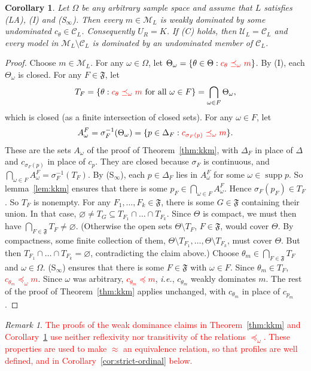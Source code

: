 \documentclass[11pt]{article}
\newtheorem{corollary}[theorem]{Corollary}
\theoremstyle{definition}
\theoremstyle{remark}
\newtheorem{remark}[theorem]{Remark}
\newcommand{\M}{\mathcal M}
\newcommand{\C}{\mathcal C}
\newcommand{\F}{\mathfrak F}
\newcommand{\U}{\mathcal U}
\newcommand{\supp}{\operatorname{supp}}
\begin{document}
\begin{corollary}\label{cor:infinite}
Let $\Omega$ be any arbitrary sample space and assume that $L$ satisfies (LA), (I) and (S$_\infty$). Then every $m\in\M_L$ is weakly dominated by some undominated $c_\theta\in\C_L$. Consequently $U_R=K$. If (C) holds, then $\U_L=\C_L$ and every model in $\M_L\setminus\C_L$ is dominated by an undominated member of $\C_L$. 
\end{corollary}
\begin{proof}
Choose $m\in\M_L$. For any $\omega\in\Omega$, let $\Theta_\omega=\{\theta\in\Theta:\textcolor{red}{c_\theta\preceq_\omega m}\}$. By (I), each $\Theta_\omega$ is closed. For any $F\in\F$, let
\[
 T_F=\{\theta:\textcolor{red}{c_\theta\preceq_\omega m}\text{ for all }\omega\in F\} = \bigcap_{\omega\in F}\Theta_\omega,
\]
which is closed (as a finite intersection of closed sets). For any $\omega\in F$, let 
\[
A^F_\omega=\sigma_F^{-1}(\Theta_\omega)=\{p\in\Delta_F:\textcolor{red}{c_{\sigma_F(p)}\preceq_\omega m}\}.
\]
These are the sets $A_\omega$ of the proof of Theorem~\ref{thm:kkm}, with $\Delta_F$ in place of $\Delta$ and $c_{\sigma_F(p)}$ in place of $c_p$. They are closed because $\sigma_F$ is continuous, and $\bigcap_{\omega\in F}A^F_\omega=\sigma_F^{-1}(T_F)$. By (S$_\infty$), each $p\in\Delta_F$ lies in $A^F_\omega$ for some $\omega\in\supp p$. So lemma~\ref{lem:kkm} ensures that there is some $p_F\in\bigcap_{\omega\in F}A^F_\omega$. Hence $\sigma_F(p_F)\in T_F$. So $T_F$ is nonempty. For any $F_1,\dots,F_k\in\F$, there is some $G\in\F$ containing their union. In that case, $\varnothing\ne T_G\subseteq T_{F_1}\cap\dots\cap T_{F_k}$. Since $\Theta$ is compact, we must then have $\bigcap_{F\in\F}T_F\neq \varnothing$. (Otherwise the open sets $\Theta\setminus T_F$, $F\in\F$, would cover $\Theta$. By compactness, some finite collection of them, $\Theta\setminus T_{F_1},\dots,\Theta\setminus T_{F_k}$, must cover $\Theta$. But then $T_{F_1}\cap\dots\cap T_{F_k}=\varnothing$, contradicting the claim above.) Choose $\theta_m\in\bigcap_{F\in\F}T_F$ and $\omega\in\Omega$. (S$_\infty$) ensures that there is some $F\in\F$ with $\omega\in F$. Since $\theta_m\in T_F$, \textcolor{red}{$c_{\theta_m}\preceq_\omega m$}. Since $\omega$ was arbitrary, \textcolor{red}{$c_{\theta_m}\preceq m$}, \textit{i.e.}, $c_{\theta_m}$ weakly dominates $m$. The rest of the proof of Theorem~\ref{thm:kkm} applies unchanged, with $c_{\theta_m}$ in place of $c_{p_m}$.
\end{proof}

\begin{remark}\label{rem:order}
\textcolor{red}{The proofs of the weak dominance claims in Theorem~\ref{thm:kkm} and Corollary~\ref{cor:infinite} use neither reflexivity nor transitivity of the relations $\preceq_\omega$. These properties are used to make $\approx$ an equivalence relation, so that profiles are well defined, and in Corollary~\ref{cor:strict-ordinal} below.}
\end{remark}
\end{document}
